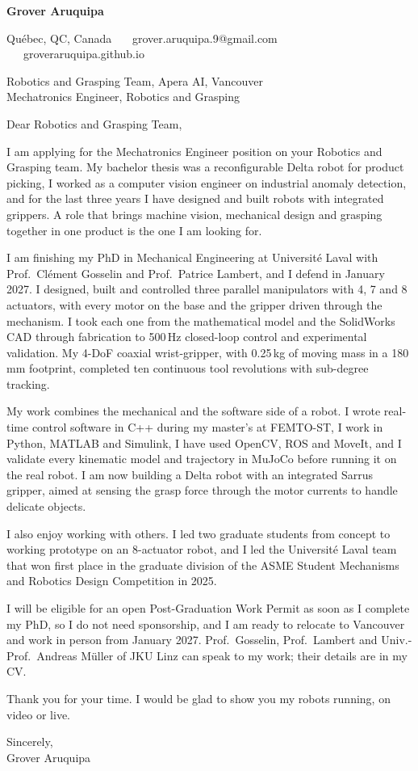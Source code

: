 \documentclass[11pt,letterpaper]{article}
\begin{document}
{\large\bfseries Grover Aruquipa}\par\vspace{-6pt}
{\small Qu\'ebec, QC, Canada \ \textbullet\ \ grover.aruquipa.9@gmail.com \ \textbullet\ \ groveraruquipa.github.io}

\vspace{4pt}
Robotics and Grasping Team, Apera AI, Vancouver\\
Mechatronics Engineer, Robotics and Grasping

Dear Robotics and Grasping Team,

I am applying for the Mechatronics Engineer position on your Robotics and Grasping team. My bachelor thesis was a reconfigurable Delta robot for product picking, I worked as a computer vision engineer on industrial anomaly detection, and for the last three years I have designed and built robots with integrated grippers. A role that brings machine vision, mechanical design and grasping together in one product is the one I am looking for.

I am finishing my PhD in Mechanical Engineering at Universit\'e Laval with Prof.\ Cl\'ement Gosselin and Prof.\ Patrice Lambert, and I defend in January 2027. I designed, built and controlled three parallel manipulators with 4, 7 and 8 actuators, with every motor on the base and the gripper driven through the mechanism. I took each one from the mathematical model and the SolidWorks CAD through fabrication to 500\,Hz closed-loop control and experimental validation. My 4-DoF coaxial wrist-gripper, with 0.25\,kg of moving mass in a 180\,mm footprint, completed ten continuous tool revolutions with sub-degree tracking.

My work combines the mechanical and the software side of a robot. I wrote real-time control software in C++ during my master's at FEMTO-ST, I work in Python, MATLAB and Simulink, I have used OpenCV, ROS and MoveIt, and I validate every kinematic model and trajectory in MuJoCo before running it on the real robot. I am now building a Delta robot with an integrated Sarrus gripper, aimed at sensing the grasp force through the motor currents to handle delicate objects.

I also enjoy working with others. I led two graduate students from concept to working prototype on an 8-actuator robot, and I led the Universit\'e Laval team that won first place in the graduate division of the ASME Student Mechanisms and Robotics Design Competition in 2025.

I will be eligible for an open Post-Graduation Work Permit as soon as I complete my PhD, so I do not need sponsorship, and I am ready to relocate to Vancouver and work in person from January 2027. Prof.\ Gosselin, Prof.\ Lambert and Univ.-Prof.\ Andreas M\"uller of JKU Linz can speak to my work; their details are in my CV.

Thank you for your time. I would be glad to show you my robots running, on video or live.

Sincerely,\\
Grover Aruquipa
\end{document}
